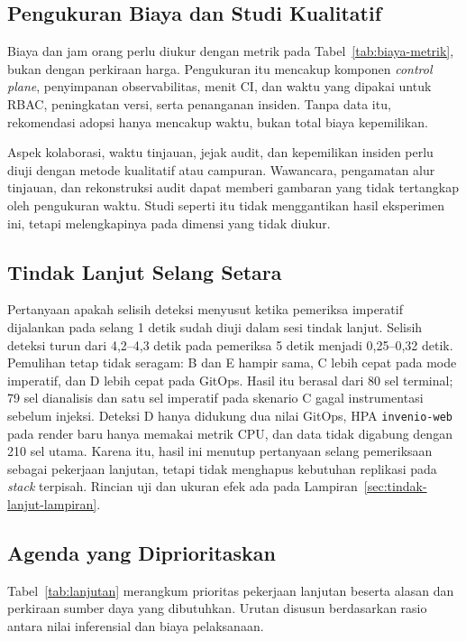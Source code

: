 \subsection{Pengukuran Biaya dan Studi Kualitatif}
\label{subsec:biaya-kualitatif}

Biaya dan jam orang perlu diukur dengan metrik pada Tabel~\ref{tab:biaya-metrik}, bukan dengan perkiraan harga. Pengukuran itu mencakup komponen \textit{control plane}, penyimpanan observabilitas, menit CI, dan waktu yang dipakai untuk RBAC, peningkatan versi, serta penanganan insiden. Tanpa data itu, rekomendasi adopsi hanya mencakup waktu, bukan total biaya kepemilikan.

Aspek kolaborasi, waktu tinjauan, jejak audit, dan kepemilikan insiden perlu diuji dengan metode kualitatif atau campuran. Wawancara, pengamatan alur tinjauan, dan rekonstruksi audit dapat memberi gambaran yang tidak tertangkap oleh pengukuran waktu. Studi seperti itu tidak menggantikan hasil eksperimen ini, tetapi melengkapinya pada dimensi yang tidak diukur.

\subsection{Tindak Lanjut Selang Setara}
\label{subsec:tindak-lanjut}

Pertanyaan apakah selisih deteksi menyusut ketika pemeriksa imperatif dijalankan pada selang 1 detik sudah diuji dalam sesi tindak lanjut. Selisih deteksi turun dari 4,2--4,3 detik pada pemeriksa 5 detik menjadi 0,25--0,32 detik. Pemulihan tetap tidak seragam: B dan E hampir sama, C lebih cepat pada mode imperatif, dan D lebih cepat pada GitOps. Hasil itu berasal dari 80 sel terminal; 79 sel dianalisis dan satu sel imperatif pada skenario C gagal instrumentasi sebelum injeksi. Deteksi D hanya didukung dua nilai GitOps, HPA \texttt{invenio-web} pada render baru hanya memakai metrik CPU, dan data tidak digabung dengan 210 sel utama. Karena itu, hasil ini menutup pertanyaan selang pemeriksaan sebagai pekerjaan lanjutan, tetapi tidak menghapus kebutuhan replikasi pada \textit{stack} terpisah. Rincian uji dan ukuran efek ada pada Lampiran~\ref{sec:tindak-lanjut-lampiran}.

\subsection{Agenda yang Diprioritaskan}
\label{subsec:agenda}

Tabel~\ref{tab:lanjutan} merangkum prioritas pekerjaan lanjutan beserta alasan dan perkiraan sumber daya yang dibutuhkan. Urutan disusun berdasarkan rasio antara nilai inferensial dan biaya pelaksanaan.

